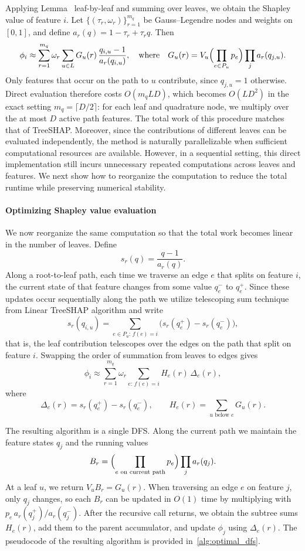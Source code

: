 \documentclass{article}
\begin{document}
Applying Lemma~ leaf-by-leaf and summing over leaves, we obtain the Shapley value of feature $i$. Let $\{(\tau_r,\omega_r)\}_{r=1}^{m_q}$ be Gauss--Legendre nodes and weights on $[0,1]$, and define $a_r(q)=1-\tau_r+\tau_r q$.
Then
\begin{equation}
\phi_i \approx \sum_{r=1}^{m_q}\omega_r \sum_{u\in L} G_u(r)\,\frac{q_{i,u}-1}{a_r(q_{i,u})},
\quad \text{where}\quad 
G_u(r)=V_u\Bigl(\prod_{e\in P_u} p_e\Bigr)\prod_j a_r(q_{j,u}).
\end{equation}
Only features that occur on the path to $u$ contribute, since $q_{j,u}=1$ otherwise. Direct evaluation therefore costs $O(m_qLD)$, which becomes $O(LD^2)$ in the exact setting $m_q=\lceil D/2\rceil$: for each leaf and quadrature node, we multiply over the at most $D$ active path features. The total work of this procedure matches that of TreeSHAP. Moreover, since the contributions of different leaves can be evaluated independently, the method is naturally parallelizable when sufficient computational resources are available. However, in a sequential setting, this direct implementation still incurs unnecessary repeated computations across leaves and features. We next show how to reorganize the computation to reduce the total runtime while preserving numerical stability.

\paragraph{Optimizing Shapley value evaluation}
We now reorganize the same computation so that the total work becomes linear in the number of leaves. Define
\[
s_r(q)=\frac{q-1}{a_r(q)}.
\]
Along a root-to-leaf path, each time we traverse an edge $e$ that splits on feature $i$, the current state of that feature changes from some value $q_e^{-}$ to $q_e^{+}$. Since these updates occur sequentially along the path we utilize telescoping sum technique from Linear TreeSHAP algorithm and write
\[
s_r(q_{i,u})=\sum_{e\in P_u:\, f(e)=i} \bigl(s_r(q_e^{+})-s_r(q_e^{-})\bigr),
\]
that is, the leaf contribution telescopes over the edges on the path that split on feature $i$. Swapping the order of summation from leaves to edges gives
\[
\phi_i \approx \sum_{r=1}^{m_q}\omega_r \sum_{e:\, f(e)=i} H_e(r)\,\Delta_e(r),
\]
where
\[
\Delta_e(r)=s_r(q_e^{+})-s_r(q_e^{-}),
\qquad
H_e(r)=\sum_{u \text{ below } e} G_u(r).
\]

The resulting algorithm is a single DFS. Along the current path we maintain the feature states $q_j$ and the running values
\[
B_r=\Bigl(\prod_{e \text{ on current path}} p_e\Bigr)\prod_j a_r(q_j).
\]
At a leaf $u$, we return $V_u B_r = G_u(r)$. When traversing an edge $e$ on feature $j$, only $q_j$ changes, so each $B_r$ can be updated in $O(1)$ time by multiplying with $p_e\, a_r(q_j^{+})/a_r(q_j^{-})$. After the recursive call returns, we obtain the subtree sums $H_e(r)$, add them to the parent accumulator, and update $\phi_j$ using $\Delta_e(r)$. The pseudocode of the resulting algorithm is provided in~\ref{alg:optimal_dfs}.
\end{document}
